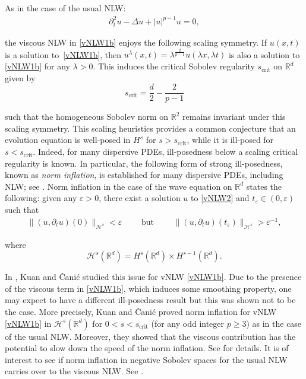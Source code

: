 \documentclass[letterpaper, 11pt,  reqno]{amsart}
\newcommand{\1}{\hspace{0.5mm}\text{I}\hspace{0.2mm}}
\newcommand{\noi}{\noindent}
\newcommand{\R}{\mathbb{R}}
\newcommand{\Dl}{\Delta}
\newcommand{\eps}{\varepsilon}
\newcommand{\ld}{\lambda}
\newcommand{\dt}{\partial_t}
\renewcommand{\H}{\mathcal{H}}
\numberwithin{equation}{section}
\numberwithin{theorem}{section}
\begin{document}
As in the case of the usual NLW:
\begin{align}
\dt^2 u - \Dl  u   + |u|^{p-1}u  = 0, 
\label{vNLW2}
\end{align}

\noi
the viscous NLW in \eqref{vNLW1b} enjoys the following scaling symmetry.
If $u(x, t)$ is a solution to~\eqref{vNLW1b}, 
then $u^\ld (x, t) = \ld^\frac{2}{p-1} u(\ld x, \ld t)$ is also a solution to \eqref{vNLW1b}
for any $\ld > 0$.
This induces  the critical Sobolev regularity $s_\text{crit}$ on $\R^d$ given by 
\[ s_\text{crit} = \frac d2 - \frac 2{p-1} \] 

\noi
such that the homogeneous Sobolev norm on $\R^2$ remains invariant
under this scaling symmetry.
This scaling heuristics provides a 
common conjecture
 that an evolution equation is well-posed in $H^s$ for $s > s_\text{crit}$, 
 while it is ill-posed for $s < s_\text{crit}$. 
Indeed, for many dispersive PDEs, 
ill-posedness below a scaling critical regularity is known.
In particular, the following form of
strong ill-posedness, known as {\it norm inflation}, 
is established for many dispersive PDEs, 
including NLW; see
\cite{CCT, BT1, CK, Kishimoto,  O1, OW, CP, Ok, Tzvet, OOTz,  FO}.
Norm inflation in the case of the wave equation on $\R^d$ states the following:
given any $\eps > 0$, 
there exist a solution $u$ to \eqref{vNLW2}
and $t_\eps  \in (0, \eps) $ such that 
\begin{align*}
 \| (u, \dt u)(0) \|_{\H^s} < \eps \qquad \text{ but } \qquad \| (u, \dt u)(t_\eps)\|_{\H^s} > \eps^{-1}, 
 \end{align*} 

\noi
where \[\H^s (\R^d) = H^s(\R^d) \times H^{s-1}(\R^d) .\]


In \cite{KC},  Kuan and \v{C}ani\'c
studied this issue
for vNLW \eqref{vNLW1b}.
Due to the presence of the viscous term in \eqref{vNLW1b},
which induces some smoothing property,  
one may  expect to have a different ill-posedness result
but this  was shown not to be the case.
More precisely, 
 Kuan and \v{C}ani\'c proved norm inflation 
for vNLW \eqref{vNLW1b}
in $\H^s(\R^d)$ for $0 < s < s_\text{crit}$
(for any odd integer   $p\geq 3$)
as in the case of the usual NLW.
Moreover, they  showed that the 
viscous contribution has the potential to slow down the speed of the norm inflation.
See \cite{KC} for details.
It is of interest to see if norm inflation 
in negative Sobolev spaces for the usual NLW
\cite{CCT, OOTz, FO}  
carries over to the viscous NLW.
See \cite{dROk}.
\end{document}
